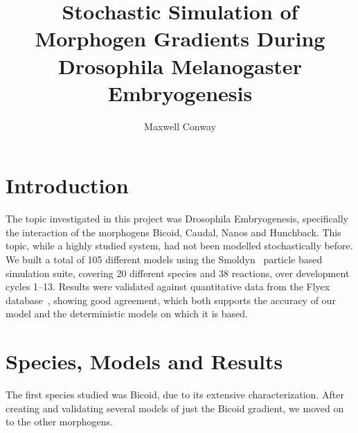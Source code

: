 \documentclass[11pt,a4paper,twocolumn]{article}
\begin{document}
\title{\vspace{-2cm}Stochastic Simulation of Morphogen Gradients During Drosophila Melanogaster Embryogenesis\vspace{-10pt}}
\author{Maxwell Conway}
\date{\vspace{-30pt}}
\maketitle
\section{Introduction}
The topic investigated in this project was Drosophila Embryogenesis, specifically the interaction of the morphogens Bicoid, Caudal, Nanos and Hunchback. This topic, while a highly studied system, had not been modelled stochastically before. We built a total of 105 different models using the Smoldyn~\cite{Andrews2010} particle based simulation suite, covering 20 different species and 38 reactions, over development cycles 1--13. Results were validated against quantitative data from the Flyex database~\cite{Pisarev2009}, showing good agreement, which both supports the accuracy of our model and the deterministic models on which it is based. 

\section{Species, Models and Results}
The first species studied was Bicoid, due to its extensive characterization. After creating and validating several models of just the Bicoid gradient, we moved on to the other morphogens.
\end{document}
